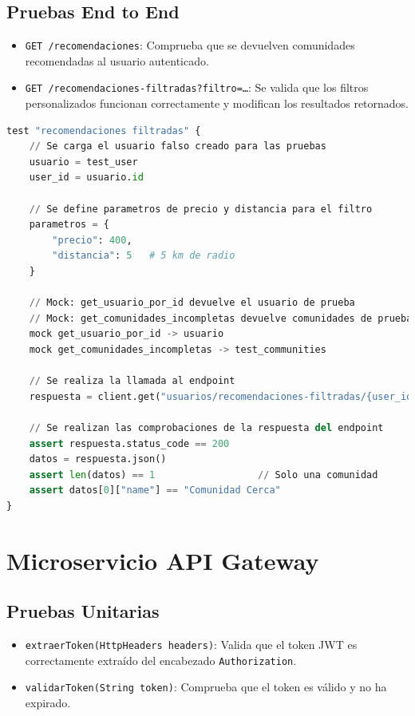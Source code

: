 \subsection{Pruebas End to End}
\begin{itemize}
    \item \texttt{GET /recomendaciones}: Comprueba que se devuelven comunidades recomendadas al usuario autenticado.
    \item \texttt{GET /recomendaciones-filtradas?filtro=\dots}: Se valida que los filtros personalizados funcionan correctamente y modifican los resultados retornados.
\end{itemize}


\begin{lstlisting}[language=Python, caption={Pseudocódigo del test recomendacionesFiltradas}]
test "recomendaciones filtradas" {
    // Se carga el usuario falso creado para las pruebas
    usuario = test_user
    user_id = usuario.id
    
    // Se define parametros de precio y distancia para el filtro
    parametros = {
        "precio": 400,
        "distancia": 5   # 5 km de radio
    }

    // Mock: get_usuario_por_id devuelve el usuario de prueba
    // Mock: get_comunidades_incompletas devuelve comunidades de prueba
    mock get_usuario_por_id -> usuario
    mock get_comunidades_incompletas -> test_communities

    // Se realiza la llamada al endpoint
    respuesta = client.get("usuarios/recomendaciones-filtradas/{user_id}", params=parametros)

    // Se realizan las comprobaciones de la respuesta del endpoint
    assert respuesta.status_code == 200
    datos = respuesta.json()
    assert len(datos) == 1                  // Solo una comunidad
    assert datos[0]["name"] == "Comunidad Cerca"
}
\end{lstlisting}

\section{Microservicio API Gateway}

\subsection{Pruebas Unitarias}
\begin{itemize}
    \item \texttt{extraerToken(HttpHeaders headers)}: Valida que el token JWT es correctamente extraído del encabezado \texttt{Authorization}.
    \item \texttt{validarToken(String token)}: Comprueba que el token es válido y no ha expirado.
\end{itemize}

